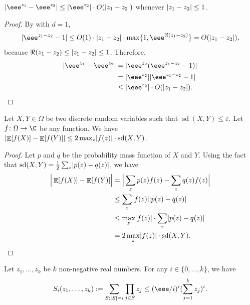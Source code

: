 \documentclass{toc}
\def\eps{\varepsilon}
\DeclarePairedDelimiter{\abs}{\lvert}{\rvert}
\DeclareMathOperator*{\E}{\mathbb{E}}                 %
\DeclareMathOperator*{\sd}{sd}             %
\begin{document}
  \begin{claim} \label{claim-exp-close}
    $\abs{\eee^{z_1} - \eee^{z_2}} \le \abs{\eee^{z_2}} \cdot O(\abs{z_1 - z_2})$ whenever $\abs{z_1 - z_2} \le 1$.
  \end{claim}
  \begin{proof}
    By  with $d = 1$,
    \[
      \abs{ \eee^{z_1 - z_2} - 1 } \le O(1) \cdot \abs{z_1 - z_2} \cdot \max\{ 1, \eee^{\Re(z_1 - z_2)} \} = O(\abs{z_1 - z_2}),
    \]
    because $\Re(z_1 - z_2) \le \abs{ z_1 - z_2 } \le 1$.
    Therefore,
    \begin{align*}
      \abs{\eee^{z_1} - \eee^{z_2}}
        &= \abs{ \eee^{z_2} (\eee^{z_1 - z_2} - 1) } \\
        &= \abs{ \eee^{z_2} } \abs{ \eee^{z_1 - z_2} - 1 } \\
        &\le \abs{ \eee^{z_2} } \cdot O(\abs{z_1 - z_2}) . \qedhere
    \end{align*}
  \end{proof}

  \begin{claim} \label{claim-sd-of-function}
    Let $X, Y \in \Omega$ be two discrete random variables such that $\sd(X, Y) \le \eps$.
    Let $f\colon \Omega \to \C$ be any function.
    We have $\abs{\E[f(X)] - \E[f(Y)]} \le 2 \max_z \abs{f(z)} \cdot \sd(X, Y)$.
  \end{claim}
  \begin{proof}
    Let $p$ and $q$ be the probability mass function of $X$ and $Y$.
    Using the fact that $\sd(X, Y) = \frac{1}{2} \sum_z \abs{p(z) - q(z)}$, we have
    \begin{align*}
      \Big| \E[f(X)] - \E[f(Y)] \Big|
      &= \Big| \sum_z p(z) f(z) - \sum_z q(z) f(z) \Big| \\
      &\le \sum_z \abs{f(z)} \abs{p(z) - q(z)} \\
      &\le \max_z \abs{f(z)} \cdot \sum_z \abs{p(z) - q(z)} \\
      &= 2 \max_z \abs{f(z)} \cdot \sd(X, Y) . \qedhere
    \end{align*}
  \end{proof}

  \begin{claim} \label{claim-maclaurin}
    Let $z_1, \ldots, z_k$ be $k$ non-negative real numbers.
    For any $i \in \{0,
    \ldots, k\}$, we have
    \[ S_i(z_1, \ldots, z_k) := \sum_{S: \abs{S} = i} \prod_{j \in S} z_j \le
    (\eee/i)^i (\sum_{j=1}^k z_j)^i. \]
  \end{claim}
\end{document}
